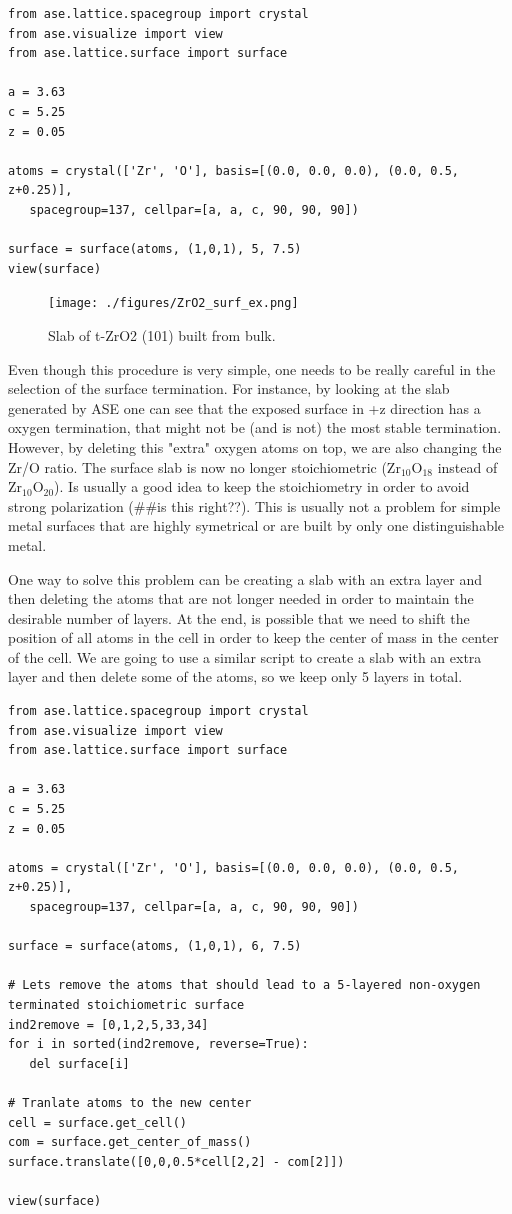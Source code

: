 \documentclass[11pt]{article}
\begin{document}
\begin{verbatim}
from ase.lattice.spacegroup import crystal
from ase.visualize import view
from ase.lattice.surface import surface

a = 3.63
c = 5.25
z = 0.05

atoms = crystal(['Zr', 'O'], basis=[(0.0, 0.0, 0.0), (0.0, 0.5, z+0.25)],
   spacegroup=137, cellpar=[a, a, c, 90, 90, 90])

surface = surface(atoms, (1,0,1), 5, 7.5)
view(surface)
\end{verbatim}

\begin{figure}[htb]
\centering
\texttt{[image: ./figures/ZrO2\_surf\_ex.png]}
\caption{Slab of t-ZrO2 (101) built from bulk.}
\end{figure}

Even though this procedure is very simple, one needs to be really careful in the selection of the surface termination. For instance, by looking at the slab generated by ASE one can see that the exposed surface in +z direction has a oxygen termination, that might not be (and is not) the most stable termination. However, by deleting this "extra" oxygen atoms on top, we are also changing the Zr/O ratio. The surface slab is now no longer stoichiometric (Zr$_{\text{10}}$O$_{\text{18}}$ instead of Zr$_{\text{10}}$O$_{\text{20}}$). Is usually a good idea to keep the stoichiometry in order to avoid strong polarization (\#\#is this right??). This is usually not a problem for simple metal surfaces that are highly symetrical or are built by only one distinguishable metal.

One way to solve this problem can be creating a slab with an extra layer and then deleting the atoms that are not longer needed in order to maintain the desirable number of layers. At the end, is possible that we need to shift the position of all atoms in the cell in order to keep the center of mass in the center of the cell. We are going to use a similar script to create a slab with an extra layer and then delete some of the atoms, so we keep only 5 layers in total.

\begin{verbatim}
from ase.lattice.spacegroup import crystal
from ase.visualize import view
from ase.lattice.surface import surface

a = 3.63
c = 5.25
z = 0.05

atoms = crystal(['Zr', 'O'], basis=[(0.0, 0.0, 0.0), (0.0, 0.5, z+0.25)],
   spacegroup=137, cellpar=[a, a, c, 90, 90, 90])

surface = surface(atoms, (1,0,1), 6, 7.5)

# Lets remove the atoms that should lead to a 5-layered non-oxygen terminated stoichiometric surface
ind2remove = [0,1,2,5,33,34]
for i in sorted(ind2remove, reverse=True):
   del surface[i]

# Tranlate atoms to the new center
cell = surface.get_cell()
com = surface.get_center_of_mass()
surface.translate([0,0,0.5*cell[2,2] - com[2]])

view(surface)
\end{verbatim}
\end{document}
